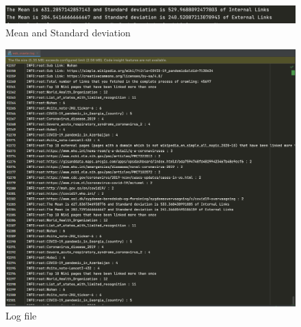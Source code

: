\documentclass{resources/WeSTassignment}
\begin{document}
\begin{figure}[h]
    \centering
    \includegraphics[scale=0.5]{resources/mean_sigma.png}
    \caption{Mean and Standard deviation}  
    \label{fig:Mean and Standard deviation}
\end{figure}
\begin{figure}[h]
    \centering
    \includegraphics[scale=0.5]{resources/log-file.png}
    \caption{Log file}  
    \label{fig:Log file}
\end{figure}
\end{document}
